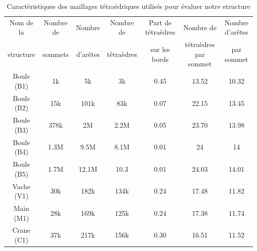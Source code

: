 \begin{table}[H]
\centering
\footnotesize
\begin{tabular}{|c | c | c | c | c| c | c |}
\hline
Nom de la & Nombre de & Nombre& Nombre de & Part de tétraèdres & Nombre de & Nombre d'arêtes\\
structure&sommets&d'arêtes &tétraèdres&sur les bords&tétraèdres par sommet & par sommet\\
\hline
Boule (B1) & 1k & 5k & 3k & 0.45 & 13.52 & 10.32 \\
Boule (B2)& 15k & 101k & 83k & 0.07 & 22.15 & 13.45\\
Boule (B3)& 378k & 2M & 2.2M & 0.05 & 23.70 & 13.98 \\
Boule (B4)& 1.3M & 9.5M & 8.1M & 0.01 & 24 & 14 \\
Boule (B5)& 1.7M & 12.1M & 10.3 & 0.01  & 24.03  & 14.01  \\
Vache (V1)& 30k & 182k & 134k & 0.24 & 17.48 & 11.82 \\
Main (M1)& 28k & 169k & 125k & 0.24 & 17.38 & 11.74\\
Crane (C1)& 37k & 217k & 156k & 0.30 & 16.51 & 11.52 \\ 
\hline  
\end{tabular}
\caption{Caractéristiques des maillages tétraédriques utilisés pour évaluer notre structure}
\label{tab:caract_maillages}
\end{table}

